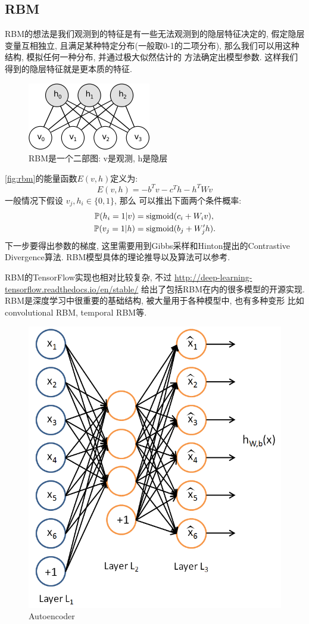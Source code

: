 \documentclass{ctexart}
\begin{document}
\subsection{RBM}
RBM的想法是我们观测到的特征是有一些无法观测到的隐层特征决定的,
假定隐层变量互相独立, 且满足某种特定分布(一般取0-1的二项分布),
那么我们可以用这种结构, 模拟任何一种分布, 并通过极大似然估计的
方法确定出模型参数. 这样我们得到的隐层特征就是更本质的特征.
\begin{figure}[htb]
  \centering
  \includegraphics[width=.8\textwidth]{rbm}
  \caption{RBM是一个二部图: v是观测, h是隐层}
  \label{fig:rbm}
\end{figure}

\autoref{fig:rbm}的能量函数\(E(v,h)\)定义为:
\[
  E(v,h) = - b^Tv - c^Th - h^TWv
\]
一般情况下假设 \(v_j, h_i \in \{0,1\}\), 那么
可以推出下面两个条件概率:
\begin{align*}
  \mathbb{P}(h_i=1|v)& = \operatorname*{sigmoid}(c_i + W_i v), \\
  \mathbb{P}(v_j=1|h)& = \operatorname*{sigmoid}(b_j + W'_j h).
\end{align*}
下一步要得出参数的梯度, 这里需要用到Gibbs采样和Hinton提出的Contrastive
Divergence算法.
RBM模型具体的理论推导以及算法可以参考\cite{fischer2012introduction}.

RBM的TensorFlow实现也相对比较复杂, 不过
\url{http://deep-learning-tensorflow.readthedocs.io/en/stable/}
给出了包括RBM在内的很多模型的开源实现.
RBM是深度学习中很重要的基础结构, 被大量用于各种模型中, 也有多种变形
比如convolutional RBM\cite{lee2009convolutional}, temporal
RBM\cite{sutskever2009recurrent}等.

\begin{figure}[t]
  \centering
  \includegraphics[width=.7\textwidth]{autoencoder}
  \caption{Autoencoder}
  \label{fig:autoencoder}
\end{figure}
\end{document}
